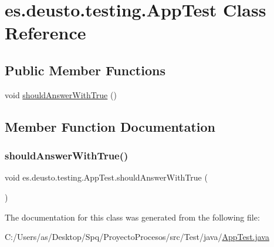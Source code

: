 \hypertarget{classes_1_1deusto_1_1testing_1_1_app_test}{}\section{es.\+deusto.\+testing.\+App\+Test Class Reference}
\label{classes_1_1deusto_1_1testing_1_1_app_test}
\subsection*{Public Member Functions}
\begin{DoxyCompactItemize}
\item 
void \mbox{\hyperlink{classes_1_1deusto_1_1testing_1_1_app_test_a330a6cb5c02c7413c2d249d44b875986}{should\+Answer\+With\+True}} ()
\end{DoxyCompactItemize}


\subsection{Member Function Documentation}
\mbox{\label{classes_1_1deusto_1_1testing_1_1_app_test_a330a6cb5c02c7413c2d249d44b875986}} 
\subsubsection{\texorpdfstring{shouldAnswerWithTrue()}{shouldAnswerWithTrue()}}
{\footnotesize\ttfamily void es.\+deusto.\+testing.\+App\+Test.\+should\+Answer\+With\+True (\begin{DoxyParamCaption}{ }\end{DoxyParamCaption})}



The documentation for this class was generated from the following file\+:\begin{DoxyCompactItemize}
\item 
C\+:/\+Users/as/\+Desktop/\+Spq/\+Proyecto\+Procesos/src/\+Test/java/\mbox{\hyperlink{_app_test_8java}{App\+Test.\+java}}\end{DoxyCompactItemize}

